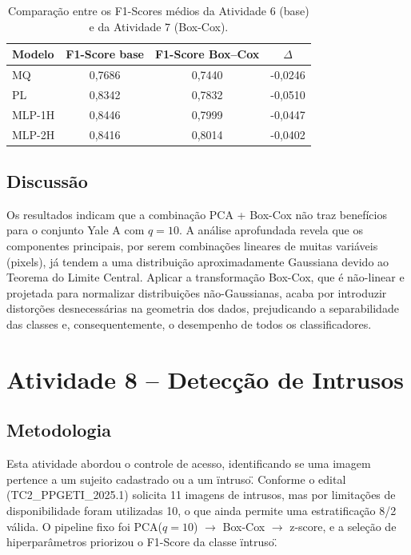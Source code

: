 \documentclass[11pt,a4paper]{article}
\begin{document}
\begin{table}[h!]
  \centering
  \caption{Comparação entre os F1-Scores médios da Atividade 6 (base) e da Atividade 7 (Box-Cox).}
  \label{tab:comparativo_f1}
  \begin{tabular}{@{}lccc@{}}
    \toprule
    Modelo & F1-Score base & F1-Score Box–Cox & \(\Delta\)\\
    \midrule
    MQ & 0,7686 & 0,7440 & -0,0246 \\
    PL & 0,8342 & 0,7832 & -0,0510 \\
    MLP-1H & 0,8446 & 0,7999 & -0,0447 \\
    MLP-2H & 0,8416 & 0,8014 & -0,0402 \\
    \bottomrule
  \end{tabular}
\end{table}

\subsection{Discussão}

Os resultados indicam que a combinação PCA + Box-Cox não traz benefícios para o conjunto Yale A com \(q=10\). A análise aprofundada revela que os componentes principais, por serem combinações lineares de muitas variáveis (pixels), já tendem a uma distribuição aproximadamente Gaussiana devido ao Teorema do Limite Central. Aplicar a transformação Box-Cox, que é não-linear e projetada para normalizar distribuições não-Gaussianas, acaba por introduzir distorções desnecessárias na geometria dos dados, prejudicando a separabilidade das classes e, consequentemente, o desempenho de todos os classificadores.

\section{Atividade 8 – Detecção de Intrusos}

\subsection{Metodologia}
Esta atividade abordou o controle de acesso, identificando se uma imagem pertence a um sujeito cadastrado ou a um \"intruso\". Conforme o edital (TC2_PPGETI_2025.1) solicita 11 imagens de intrusos, mas por limitações de disponibilidade foram utilizadas 10, o que ainda permite uma estratificação 8/2 válida. O pipeline fixo foi PCA(\(q=10\)) \(\rightarrow\) Box-Cox \(\rightarrow\) z-score, e a seleção de hiperparâmetros priorizou o F1-Score da classe \"intruso\".
\end{document}
